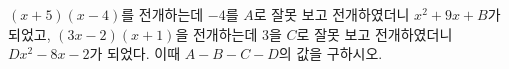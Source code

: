 $(x+5)(x-4)$를 전개하는데 $-4$를 $A$로 잘못 보고 전개하였더니 $x^2+9x+B$가 되었고, $(3x-2)(x+1)$을 전개하는데 $3$을 $C$로 잘못 보고 전개하였더니 $Dx^2-8x-2$가 되었다. 이때 $A-B-C-D$의 값을 구하시오. 
